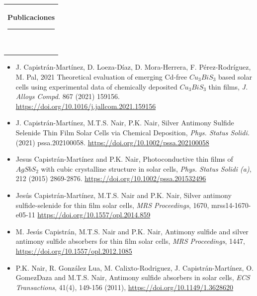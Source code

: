 \documentclass[10pt,letter]{article}
\newcommand{\mpwidth}{\linewidth-\fboxsep-\fboxsep}
\newcommand{\cvtext}[1] {
	\begin{tabular*}{1\mpwidth}{p{0.98\mpwidth}}
		\parbox{1\mpwidth}{#1}
	\end{tabular*}
}
\newcommand{\cvsection}[1] {
	\vspace{14pt}
	\cvtext{
		\textbf{\LARGE{\textcolor{darkcol}{#1}}}\\[-4pt]
		\textcolor{accentcol}{ \rule{0.2\textwidth}{1.5pt} } \\
	}
}
\begin{document}
\begin{paracol}{2}
\begin{rightcolumn}
	

\cvsection{Publicaciones}

\begin{itemize}[leftmargin=*]

\item J. Capistr\'an-Mart\'inez, D. Loeza-D\'iaz, D. Mora-Herrera, F. P\'erez-Rodr\'iguez, M. Pal, 2021 Theoretical evaluation of emerging Cd-free $Cu_3BiS_3$ based solar cells using experimental
data of chemically deposited $Cu_3BiS_3$ thin films, \textit{J. Alloys Compd.} 867 (2021) 159156. \url{https://doi.org/10.1016/j.jallcom.2021.159156}

\item J. Capistr\'an-Mart\'inez, M.T.S. Nair, P.K. Nair, Silver Antimony Sulfide Selenide Thin Film Solar Cells via Chemical Deposition, \textit{Phys. Status Solidi.} (2021) pssa.202100058. \url{https://doi.org/10.1002/pssa.202100058}

\item Jesus Capistr\'an-Mart\'inez and P.K. Nair, Photoconductive thin films of $AgSbS_2$ with cubic crystalline structure in solar cells, \textit{Phys. Status Solidi (a)}, 212 (2015) 2869-2876. \url{https://doi.org/10.1002/pssa.201532496}

\item Jes\'us Capistr\'an-Mart\'inez, M.T.S. Nair and P.K. Nair, Silver antimony sulfide-selenide for thin film solar cells, \textit{MRS Proceedings}, 1670, mrss14-1670-e05-11 \url{https://doi.org/10.1557/opl.2014.859}

\item M. Jes\'us Capistr\'an, M.T.S. Nair and P.K. Nair, Antimony sulfide and silver antimony sulfide absorbers for thin film solar cells, \textit{MRS Proceedings}, 1447, \url{https://doi.org/10.1557/opl.2012.1085}

\item P.K. Nair, R. Gonz\'alez Lua, M. Calixto-Rodriguez, J. Capistr\'an-Mart\'inez, O. GomezDaza and M.T.S. Nair, Antimony sulfide absorbers in solar cells, \textit{ECS Transactions}, 41(4), 149-156 (2011), \url{https://doi.org/10.1149/1.3628620}


\end{itemize}
\end{rightcolumn}
\end{paracol}
\end{document}
